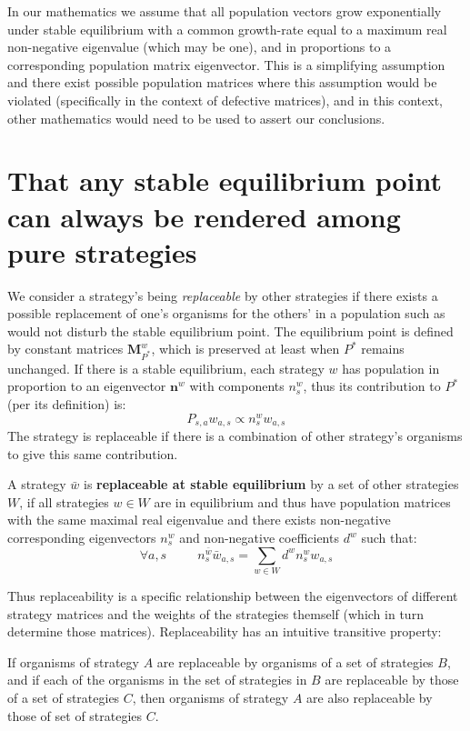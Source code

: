 In our mathematics we assume that all population vectors grow exponentially under stable equilibrium with a common growth-rate equal to a maximum real non-negative eigenvalue (which may be one), and in proportions to a corresponding population matrix eigenvector.
This is a simplifying assumption and there exist possible population matrices where this assumption would be violated (specifically in the context of defective matrices), and in this context, other mathematics would need to be used to assert our conclusions.

\section{That any stable equilibrium point can always be rendered among pure strategies}\label{appendix5}
We consider a strategy's being \textit{replaceable} by other strategies if there exists a possible replacement of one's organisms for the others' in a population such as would not disturb the stable equilibrium point. The equilibrium point is defined by constant matrices $\mathbf{M}_{P^*}^w$, which is preserved at least when $P^*$ remains unchanged.
If there is a stable equilibrium, each strategy $w$ has population in proportion to an eigenvector $\mathbf{n}^w$ with components $n^w_s$, thus its contribution to $P^*$ (per its definition) is:
$$P_{s,a}w_{a,s} \propto n^w_sw_{a,s}$$
The strategy is replaceable if there is a combination of other strategy's organisms to give this same contribution.

\begin{Definition}\label{def1}
A strategy $\bar{w}$ is \textbf{replaceable at stable equilibrium} by a set of other strategies $W$, if all strategies $w\in W$ are in equilibrium and thus have population matrices with the same maximal real eigenvalue and there exists non-negative corresponding eigenvectors $n^w_s$ and non-negative coefficients $d^w$ such that:
$$\forall a,s~~~~~~~~~~~ n^{\bar{w}}_s\bar{w}_{a,s} = \sum_{w\in W}d^wn^w_sw_{a,s} $$
\end{Definition}

Thus replaceability is a specific relationship between the eigenvectors of different strategy matrices and the weights of the strategies themself (which in turn determine those matrices).
Replaceability has an intuitive transitive property:

\begin{Definition}\label{def3}
If organisms of strategy $A$ are replaceable by organisms of a set of strategies $B$, and if each of the organisms in the set of strategies in $B$ are replaceable by those of a set of strategies $C$, then organisms of strategy $A$ are also replaceable by those of set of strategies $C$.
\end{Definition}

